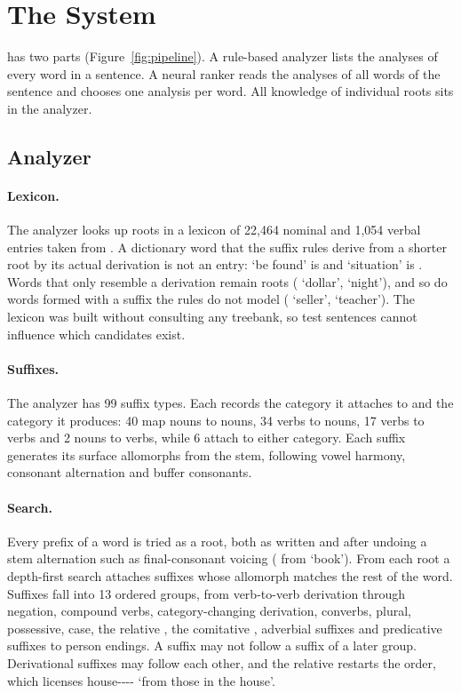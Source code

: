\section{The \savyar{} System}
\label{sec:system}



\savyar{} has two parts (Figure~\ref{fig:pipeline}). A rule-based analyzer lists the analyses of every word in a sentence. A neural ranker reads the analyses of all words of the sentence and chooses one analysis per word. All knowledge of individual roots sits in the analyzer.

\subsection{Analyzer}
\label{sec:analyzer}

\paragraph{Lexicon.}
The analyzer looks up roots in a lexicon of 22,464 nominal and 1,054 verbal entries taken from . A dictionary word that the suffix rules derive from a shorter root by its actual derivation is not an entry:  `be found' is  and  `situation' is . Words that only resemble a derivation remain roots ( `dollar',  `night'), and so do words formed with a suffix the rules do not model ( `seller',  `teacher'). The lexicon was built without consulting any treebank, so test sentences cannot influence which candidates exist.

\paragraph{Suffixes.}
The analyzer has 99 suffix types. Each records the category it attaches to and the category it produces: 40 map nouns to nouns, 34 verbs to nouns, 17 verbs to verbs and 2 nouns to verbs, while 6 attach to either category. Each suffix generates its surface allomorphs from the stem, following vowel harmony, consonant alternation and buffer consonants.

\paragraph{Search.}
Every prefix of a word is tried as a root, both as written and after undoing a stem alternation such as final-consonant voicing ( from  `book'). From each root a depth-first search attaches suffixes whose allomorph matches the rest of the word. Suffixes fall into 13 ordered groups, from verb-to-verb derivation through negation, compound verbs, category-changing derivation, converbs, plural, possessive, case, the relative , the comitative , adverbial suffixes and predicative suffixes to person endings. A suffix may not follow a suffix of a later group. Derivational suffixes may follow each other, and the relative  restarts the order, which licenses  house---- `from those in the house'.

